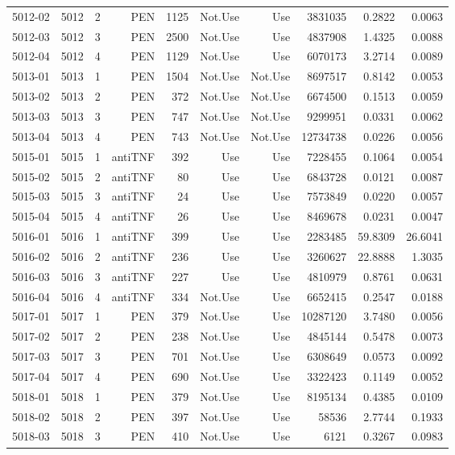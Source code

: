 {\begin{longtable}{ | r | r | r | r | r | r | r | r | r | r | }
5012-02 & 5012 & 2 & PEN & 1125 & Not.Use & Use & 3831035 & 0.2822 & 0.0063\\ 
5012-03 & 5012 & 3 & PEN & 2500 & Not.Use & Use & 4837908 & 1.4325 & 0.0088\\ 
5012-04 & 5012 & 4 & PEN & 1129 & Not.Use & Use & 6070173 & 3.2714 & 0.0089\\ 
5013-01 & 5013 & 1 & PEN & 1504 & Not.Use & Not.Use & 8697517 & 0.8142 & 0.0053\\ 
5013-02 & 5013 & 2 & PEN & 372 & Not.Use & Not.Use & 6674500 & 0.1513 & 0.0059\\ 
5013-03 & 5013 & 3 & PEN & 747 & Not.Use & Not.Use & 9299951 & 0.0331 & 0.0062\\ 
5013-04 & 5013 & 4 & PEN & 743 & Not.Use & Not.Use & 12734738 & 0.0226 & 0.0056\\ 
5015-01 & 5015 & 1 & antiTNF & 392 & Use & Use & 7228455 & 0.1064 & 0.0054\\ 
5015-02 & 5015 & 2 & antiTNF & 80 & Use & Use & 6843728 & 0.0121 & 0.0087\\ 
5015-03 & 5015 & 3 & antiTNF & 24 & Use & Use & 7573849 & 0.0220 & 0.0057\\ 
5015-04 & 5015 & 4 & antiTNF & 26 & Use & Use & 8469678 & 0.0231 & 0.0047\\ 
5016-01 & 5016 & 1 & antiTNF & 399 & Use & Use & 2283485 & 59.8309 & 26.6041\\ 
5016-02 & 5016 & 2 & antiTNF & 236 & Use & Use & 3260627 & 22.8888 & 1.3035\\ 
5016-03 & 5016 & 3 & antiTNF & 227 & Use & Use & 4810979 & 0.8761 & 0.0631\\ 
5016-04 & 5016 & 4 & antiTNF & 334 & Not.Use & Use & 6652415 & 0.2547 & 0.0188\\ 
5017-01 & 5017 & 1 & PEN & 379 & Not.Use & Use & 10287120 & 3.7480 & 0.0056\\ 
5017-02 & 5017 & 2 & PEN & 238 & Not.Use & Use & 4845144 & 0.5478 & 0.0073\\ 
5017-03 & 5017 & 3 & PEN & 701 & Not.Use & Use & 6308649 & 0.0573 & 0.0092\\ 
5017-04 & 5017 & 4 & PEN & 690 & Not.Use & Use & 3322423 & 0.1149 & 0.0052\\ 
5018-01 & 5018 & 1 & PEN & 379 & Not.Use & Use & 8195134 & 0.4385 & 0.0109\\ 
5018-02 & 5018 & 2 & PEN & 397 & Not.Use & Use & 58536 & 2.7744 & 0.1933\\ 
5018-03 & 5018 & 3 & PEN & 410 & Not.Use & Use & 6121 & 0.3267 & 0.0983\\ 

\end{longtable}}
